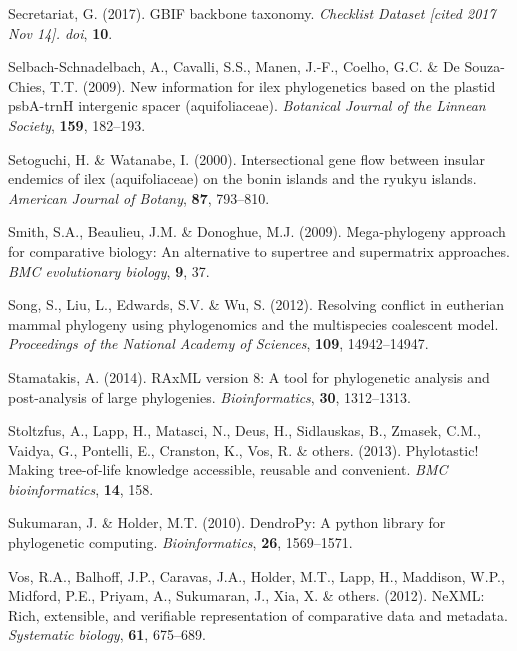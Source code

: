 \documentclass[]{article}
\begin{document}
\leavevmode\hypertarget{ref-secretariat2017gbif}{}%
Secretariat, G. (2017). GBIF backbone taxonomy. \emph{Checklist Dataset {[}cited 2017 Nov 14{]}. doi}, \textbf{10}.

\leavevmode\hypertarget{ref-selbach2009new}{}%
Selbach-Schnadelbach, A., Cavalli, S.S., Manen, J.-F., Coelho, G.C. \& De Souza-Chies, T.T. (2009). New information for ilex phylogenetics based on the plastid psbA-trnH intergenic spacer (aquifoliaceae). \emph{Botanical Journal of the Linnean Society}, \textbf{159}, 182--193.

\leavevmode\hypertarget{ref-setoguchi2000intersectional}{}%
Setoguchi, H. \& Watanabe, I. (2000). Intersectional gene flow between insular endemics of ilex (aquifoliaceae) on the bonin islands and the ryukyu islands. \emph{American Journal of Botany}, \textbf{87}, 793--810.

\leavevmode\hypertarget{ref-smith2009mega}{}%
Smith, S.A., Beaulieu, J.M. \& Donoghue, M.J. (2009). Mega-phylogeny approach for comparative biology: An alternative to supertree and supermatrix approaches. \emph{BMC evolutionary biology}, \textbf{9}, 37.

\leavevmode\hypertarget{ref-song2012resolving}{}%
Song, S., Liu, L., Edwards, S.V. \& Wu, S. (2012). Resolving conflict in eutherian mammal phylogeny using phylogenomics and the multispecies coalescent model. \emph{Proceedings of the National Academy of Sciences}, \textbf{109}, 14942--14947.

\leavevmode\hypertarget{ref-stamatakis2014raxml}{}%
Stamatakis, A. (2014). RAxML version 8: A tool for phylogenetic analysis and post-analysis of large phylogenies. \emph{Bioinformatics}, \textbf{30}, 1312--1313.

\leavevmode\hypertarget{ref-stoltzfus2013phylotastic}{}%
Stoltzfus, A., Lapp, H., Matasci, N., Deus, H., Sidlauskas, B., Zmasek, C.M., Vaidya, G., Pontelli, E., Cranston, K., Vos, R. \& others. (2013). Phylotastic! Making tree-of-life knowledge accessible, reusable and convenient. \emph{BMC bioinformatics}, \textbf{14}, 158.

\leavevmode\hypertarget{ref-sukumaran2010dendropy}{}%
Sukumaran, J. \& Holder, M.T. (2010). DendroPy: A python library for phylogenetic computing. \emph{Bioinformatics}, \textbf{26}, 1569--1571.

\leavevmode\hypertarget{ref-vos2012nexml}{}%
Vos, R.A., Balhoff, J.P., Caravas, J.A., Holder, M.T., Lapp, H., Maddison, W.P., Midford, P.E., Priyam, A., Sukumaran, J., Xia, X. \& others. (2012). NeXML: Rich, extensible, and verifiable representation of comparative data and metadata. \emph{Systematic biology}, \textbf{61}, 675--689.
\end{document}
